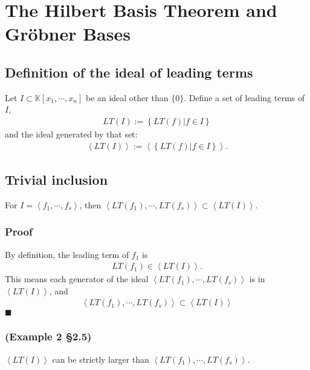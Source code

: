 \documentclass[11pt]{book}
\begin{document}


\section{The Hilbert Basis Theorem and Gr\"obner Bases}
\subsection{Definition of the ideal of leading terms}
Let $I \subset \mathbb{K}[x_1, \cdots, x_{n}]$ be an ideal other than $\{0\}$.
Define a set of leading terms of $I$, 
\begin{eqnarray}
LT(I) := \left\{ \left. LT(f) \right| f \in I \right\} 
\end{eqnarray}
and the ideal generated by that set:
\begin{eqnarray}
\left< LT(I) \right>  := \left< \left\{ \left. LT(f) \right| f \in I \right\} \right>.
\end{eqnarray}

\subsection{Trivial inclusion}
\label{LargerLemma}
For $I = \left< f_1, \cdots, f_s \right>$, then $\left< LT(f_1), \cdots, LT(f_s) \right> \subset \left< LT(I) \right>$.

\subsubsection{Proof}
By definition, the leading term of $f_1$ is
\begin{eqnarray}
LT(f_1) \in \left< LT(I) \right>.
\end{eqnarray}
This means each generator of the ideal $\left< LT(f_1), \cdots, LT(f_s) \right>$ is in $\left< LT(I) \right>$, and
\begin{eqnarray}
\left< LT(f_1), \cdots, LT(f_s) \right> \subset \left< LT(I) \right>
\end{eqnarray}
$\blacksquare$

\subsubsection{(Example 2 \S2.5)}
$\left< LT(I) \right>$ can be strictly larger than $\left< LT(f_1), \cdots, LT(f_s) \right>$.
\end{document}
